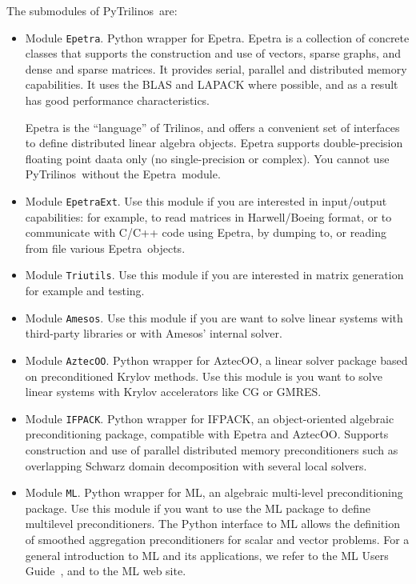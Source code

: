 \documentclass[10pt,relax]{SANDreport}
\newcommand{\PyTrilinos}{{PyTrilinos}}
\newcommand{\epetra}{{Epetra}}
\begin{document}
The submodules of \PyTrilinos\ are:
\begin{itemize}
\item Module {\tt Epetra}. Python wrapper for Epetra. Epetra is a collection
of concrete classes that supports the construction and use of vectors, sparse
graphs, and dense and sparse matrices. It provides serial, parallel and
distributed memory capabilities. It uses the BLAS and LAPACK where possible,
  and as a result has good performance characteristics.

Epetra is the
``language'' of Trilinos, and offers a convenient set of interfaces to define
distributed linear algebra objects. Epetra supports double-precision floating
point daata only (no single-precision or complex). 
You cannot use \PyTrilinos\ without the \epetra\ module.
%
\item Module {\tt EpetraExt}. Use this module if you are interested in input/output
capabilities: for example, to read matrices in Harwell/Boeing format, or to
communicate with C/C++ code using Epetra, by dumping to, or reading from file
various \epetra\ objects.
%
\item Module {\tt Triutils}. Use this module if you are interested in matrix
generation for example and testing.
%
\item Module {\tt Amesos}. Use this module if you are want to solve linear
systems with third-party libraries or with Amesos' internal solver.
%
\item Module {\tt AztecOO}. Python wrapper for AztecOO, a
linear solver  package based on preconditioned Krylov methods. 
Use this module is you want to solve linear
systems with Krylov accelerators like CG or GMRES.
%
\item Module {\tt IFPACK}. Python wrapper for IFPACK, an object-oriented
algebraic preconditioning package, compatible with Epetra and AztecOO.
Supports construction and use of parallel distributed memory preconditioners
such as overlapping Schwarz domain decomposition with several local solvers.
%
\item Module {\tt ML}. Python wrapper for ML, an algebraic multi-level
preconditioning package. Use this module if you want to use the ML package to
define multilevel preconditioners. The Python interface to ML allows the
definition of smoothed aggregation preconditioners for scalar and vector
problems. For a general introduction to ML and its applications, we refer to
the ML Users Guide~\cite{ml-guide}, and to the ML web site.
\end{itemize}
\end{document}
